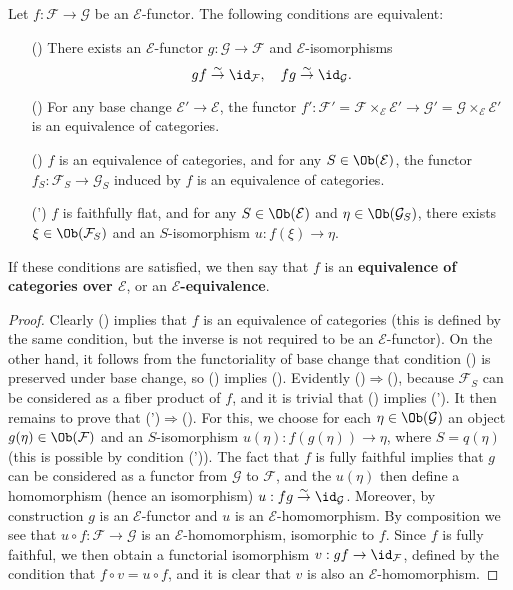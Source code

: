 \begin{proposition}\label{fiber cat functor E-equivalence iff base change}
Let $f:\mathcal{F}\to \mathcal{G}$ be an $\mathcal{E}$-functor. The following conditions are equivalent:
\begin{enumerate}
\item[(\rmnum{1})] There exists an $\mathcal{E}$-functor $g:\mathcal{G}\to \mathcal{F}$ and $\mathcal{E}$-isomorphisms
\[gf\stackrel{\sim}{\to }\id_{\mathcal{F}},\quad fg\stackrel{\sim}{\to }\id_{\mathcal{G}}.\]
\item[(\rmnum{2})] For any base change $\mathcal{E}'\to \mathcal{E}$, the functor $f':\mathcal{F}'=\mathcal{F}\times_\mathcal{E}\mathcal{E}'\to \mathcal{G}'=\mathcal{G}\times_\mathcal{E}\mathcal{E}'$ is an equivalence of categories.
\item[(\rmnum{3})] $f$ is an equivalence of categories, and for any $S\in\Ob(\mathcal{E})$, the functor $f_S:\mathcal{F}_S\to \mathcal{G}_S$ induced by $f$ is an equivalence of categories.
\item[(\rmnum{3}')] $f$ is faithfully flat, and for any $S\in\Ob(\mathcal{E})$ and $\eta\in\Ob(\mathcal{G}_S)$, there exists $\xi\in\Ob(\mathcal{F}_S)$ and an $S$-isomorphism $u:f(\xi)\to \eta$.
\end{enumerate}
If these conditions are satisfied, we then say that $f$ is an \textbf{equivalence of categories over $\mathcal{E}$}, or an \textbf{$\mathcal{E}$-equivalence}.
\end{proposition}
\begin{proof}
Clearly () implies that $f$ is an equivalence of categories (this is defined by the same condition, but the inverse is not required to be an $\mathcal{E}$-functor). On the other hand, it follows from the functoriality of base change that condition () is preserved under base change, so () implies (). Evidently ()$\Rightarrow$(), because $\mathcal{F}_S$ can be considered as a fiber product of $f$, and it is trivial that () implies ('). It then remains to prove that (')$\Rightarrow$(). For this, we choose for each $\eta\in\Ob(\mathcal{G})$ an object $g(\eta)\in\Ob(\mathcal{F})$ and an $S$-isomorphism $u(\eta):f(g(\eta))\to \eta$, where $S=q(\eta)$ (this is possible by condition (')). The fact that $f$ is fully faithful implies that $g$ can be considered as a functor from $\mathcal{G}$ to $\mathcal{F}$, and the $u(\eta)$ then define a homomorphism (hence an isomorphism) $u:fg\stackrel{\sim}{\to }\id_\mathcal{G}$. Moreover, by construction $g$ is an $\mathcal{E}$-functor and $u$ is an $\mathcal{E}$-homomorphism. By composition we see that $u\circ f:\mathcal{F}\to \mathcal{G}$ is an $\mathcal{E}$-homomorphism, isomorphic to $f$. Since $f$ is fully faithful, we then obtain a functorial isomorphism $v:gf\to \id_\mathcal{F}$, defined by the condition that $f\circ v=u\circ f$, and it is clear that $v$ is also an $\mathcal{E}$-homomorphism.
\end{proof}
